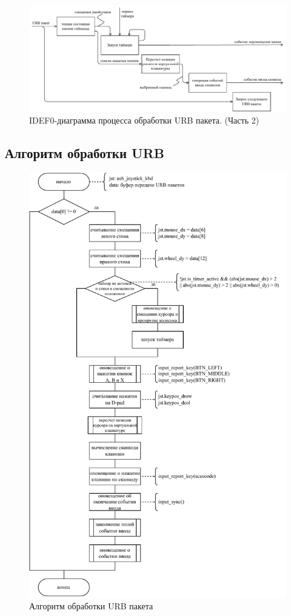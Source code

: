 \begin{figure}[ht]
    \centering
    \includegraphics[width=\linewidth]{img/idef0-A1.pdf}
    \caption{IDEF0-диаграмма процесса обработки URB пакета. (Часть 2)}
\end{figure}

\subsection{Алгоритм обработки URB}

\begin{figure}[ht]
    \centering
    \includegraphics[keepaspectratio,width=\linewidth,height=0.85\textheight]{img/urb-handle.pdf}
    \caption{Алгоритм обработки URB пакета}
    \label{alg:urb-handle}
\end{figure}

